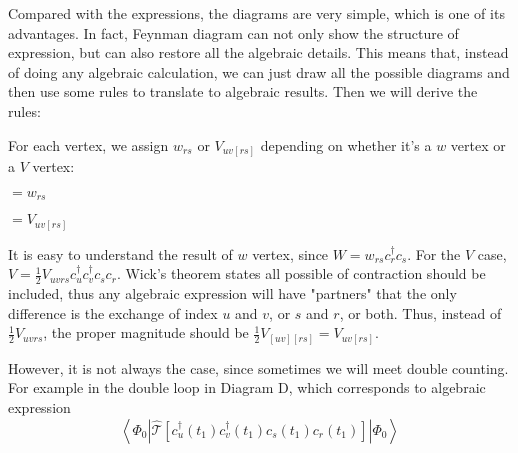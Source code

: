 Compared with the expressions, the diagrams are very simple, which is one of its advantages.
In fact, Feynman diagram can not only show the structure of expression, but can also restore all the algebraic details.
This means that, instead of doing any algebraic calculation, we can just draw all the possible diagrams and then use some rules to translate to algebraic results.
Then we will derive the rules:

For each vertex, we assign $w_{rs}$ or $V_{uv[rs]}$ depending on whether it's a $w$ vertex or a $V$ vertex:

\hspace{0.2\textwidth}
\begin{minipage}{0.1\textwidth}
\begin{feynman} 
\end{feynman}
\end{minipage}
\begin{minipage}{0.2\textwidth}
	$=w_{rs}$
\end{minipage}
\begin{minipage}{0.16\textwidth}
\begin{feynman} 
\end{feynman}
\end{minipage}
\begin{minipage}{0.1\textwidth}
	$=V_{uv[rs]}$
\end{minipage}

It is easy to understand the result of $w$ vertex, since $W=w_{rs} c_r^{\dagger} c_s$.
For the $V$ case, $V=\frac{1}{2}V_{uvrs} c_u^{\dagger} c_v^{\dagger} c_s c_r$.
Wick's theorem states all possible of contraction should be included, thus any algebraic expression will have "partners" that the only difference is the exchange of index $u$ and $v$, or $s$ and $r$, or both.
Thus, instead of $\frac{1}{2}V_{uvrs}$, the proper magnitude should be $\frac{1}{2}V_{[uv][rs]}=V_{uv[rs]}$.

However, it is not always the case, since sometimes we will meet double counting.
For example in the double loop in Diagram D, which corresponds to algebraic expression
\begin{equation}
	\left\langle\Phi_{0}\left|
	\hat{\mathcal{T}}\left[
		c_{u}^{\dagger}\left(t_{1}\right) 
		c_{v}^{\dagger}\left(t_{1}\right)
		c_{s}\left(t_{1}\right) 
		c_{r}\left(t_{1}\right)
	\right]
	\right| \Phi_{0}\right\rangle
\end{equation}

